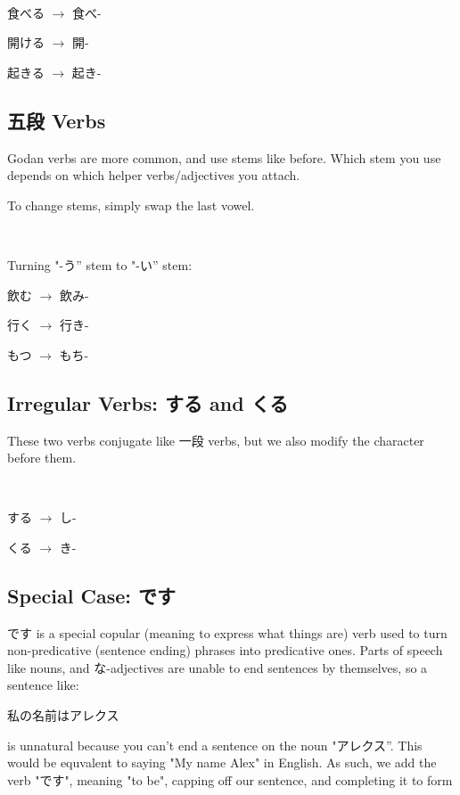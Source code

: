 \documentclass{article}
\begin{document}
\begin{CJK}{UTF8}{min}
\begin{example}
\ 

食べる $\rightarrow$ 食べ-

開ける $\rightarrow$ 開-

起きる $\rightarrow$ 起き-
\end{example}

\subsection{五段 Verbs}

Godan verbs are more common, and use stems like before. Which stem you use depends on which helper verbs/adjectives you attach.

To change stems, simply swap the last vowel.

\begin{example}
\ 

    Turning "-う” stem to "-い” stem:

飲む $\rightarrow$ 飲み-

行く $\rightarrow$ 行き-

もつ $\rightarrow$ もち-
\end{example}

\subsection{Irregular Verbs: する and くる}

These two verbs conjugate like 一段 verbs, but we also modify the character before them.

\begin{example}
    \ 

する $\rightarrow$ し-

くる $\rightarrow$ き-
\end{example}

\subsection{Special Case: です}

です is a special copular (meaning to express what things are) verb used to turn non-predicative (sentence ending) phrases into predicative ones. Parts of speech like nouns, and な-adjectives are unable to end sentences by themselves, so a sentence like:

\begin{example}
私の名前はアレクス
\end{example}
is unnatural because you can't end a sentence on the noun "アレクス”. This would be equvalent to saying "My name Alex" in English. As such, we add the verb "です", meaning "to be", capping off our sentence, and completing it to form


\end{CJK}
\end{document}
